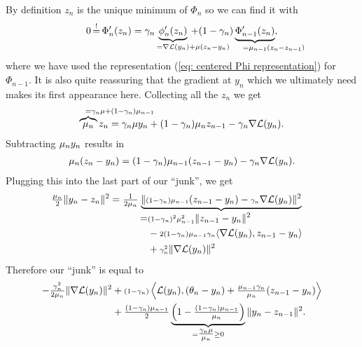 By definition \(z_n\) is the unique minimum of \(\Phi_n\) so we can find
it with
\begin{align*}
	0\xeq{!}\Phi'_n(z_n)
	= \gamma_n\underbrace{\phi_n'(z_n)}_{
		= \nabla\Loss(y_n) \mathrlap{+ \lbound(z_n-y_n)}
	} +(1-\gamma_n)
	\underbrace{\Phi'_{n-1}(z_n)}_{
		=\lbound_{n-1}\mathrlap{(z_n-z_{n-1})}
	},
\end{align*}
where we have used the representation (\ref{eq: centered Phi representation})
for \(\Phi_{n-1}\). It is also quite reassuring that the gradient at \(y_n\)
which we ultimately need makes its first appearance here. Collecting all
the \(z_n\) we get
\begin{align}\label{eq: center of Phi recursion}
	\overbrace{\lbound_n}^{
		=\mathrlap{\gamma_n\lbound + (1-\gamma_n)\lbound_{n-1}}
	}z_n
	= \gamma_n\lbound y_n + (1-\gamma_n)\lbound_n z_{n-1}
	- \gamma_n\nabla\Loss(y_n).
\end{align}
Subtracting \(\mu_n y_n\) results in
\begin{align*}
	\mu_n(z_n-y_n)
	= (1-\gamma_n)\mu_{n-1}(z_{n-1}-y_n)
	- \gamma_n\nabla\mathcal{L}(y_n).
\end{align*}
Plugging this into the last part of our ``junk'', we get
\begin{align*}
	\tfrac{\mu_n}2\|y_n-z_n\|^2
	&= \tfrac1{2\mu_n}
	\underbrace{
		\|{\scriptstyle (1-\gamma_n)\mu_{n-1}}(z_{n-1}-y_n)
		- {\scriptstyle \gamma_n}\nabla\mathcal{L}(y_n)\|^2
	}_{
	\begin{aligned}
		=&{\scriptstyle (1-\gamma_n)^2\mu_{n-1}^2}\|z_{n-1}-y_n\|^2 \\
		&- {\scriptstyle 2(1-\gamma_n)\mu_{n-1}\gamma_n}\langle
		\nabla\mathcal{L}(y_n), z_{n-1}-y_n\rangle \\
		&+ {\scriptstyle\gamma_n^2}\|\nabla\mathcal{L}(y_n)\|^2
	\end{aligned}
	}
\end{align*}
Therefore our ``junk'' is equal to
\begin{align*}
	-\tfrac{\gamma_n^2}{2\mu_n}\|\nabla\mathcal{L}(y_n)\|^2
	\begin{aligned}[t]
		&+ {\scriptstyle(1-\gamma_n)}\left\langle \mathcal{L}(y_n),
		(\theta_n -y_n)
		+ \tfrac{\mu_{n-1}\gamma_n}{\mu_n}(z_{n-1} - y_n)
		\right\rangle\\
		&+\tfrac{(1-\gamma_n)\mu_{n-1}}{2}
		\underbrace{\left(1-\tfrac{(1-\gamma_n)\mu_{n-1}}{\mu_n}\right)}_{
			= \tfrac{\gamma_n \mu}{\mu_n} \ge 0
		}
		\|y_n - z_{n-1}\|^2.
	\end{aligned}
\end{align*}
